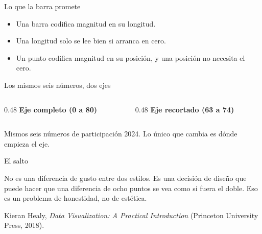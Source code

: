 \begin{frame}{Lo que la barra promete}
  \vspace{0.3em}
  \begin{itemize}\setlength{\itemsep}{0.9em}
    \item<1-> Una barra codifica magnitud en su \ac{longitud}.
    \item<2-> Una longitud solo se lee bien si arranca en cero.
    \item<3-> Un punto codifica magnitud en su \ac{posición}, y una
          posición no necesita el cero.
  \end{itemize}
\end{frame}

\begin{frame}{Los mismos seis números, dos ejes}
\begin{columns}[T]
  \begin{column}{0.48\textwidth}
    \centering
    {\footnotesize\color{verdeProfundo}\textbf{Eje completo (0 a 80)}}\\[0.5em]
  \end{column}
  \begin{column}{0.48\textwidth}
    \centering
    {\footnotesize\color{guinda}\textbf{Eje recortado (63 a 74)}}\\[0.5em]
  \end{column}
\end{columns}
\vspace{0.8em}
{\small\color{grisTenue}Mismos seis números de participación 2024. Lo
único que cambia es dónde empieza el eje.}
\end{frame}

\begin{frame}{El salto}
  \vspace{0.6em}
  \begin{saltobox}
    No es una diferencia de gusto entre dos estilos. Es una decisión de
    diseño que puede hacer que una diferencia de ocho puntos se vea como
    si fuera el doble. Eso es un problema de honestidad, no de estética.
  \end{saltobox}

  \vspace{1.2em}
  {\small\color{grisTenue}Kieran Healy, \textit{Data Visualization: A
  Practical Introduction} (Princeton University Press, 2018).}
\end{frame}

